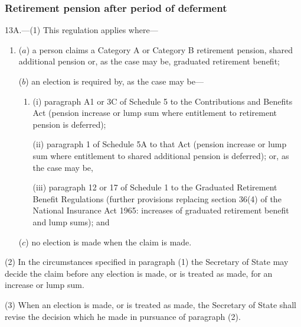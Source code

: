\documentclass[12pt,a4paper]{article}
\begin{document}

\subsubsection[13A. Retirement pension after period of deferment]{Retirement pension after period of deferment}

13A.---(1)  This regulation applies where—
\begin{enumerate}\item[]
($a$) a person claims a Category A or Category B retirement pension, shared additional pension or, as the case may be, graduated retirement benefit;

($b$) an election is required by, as the case may be—
\begin{enumerate}\item[]
(i) paragraph A1 or 3C of Schedule 5 to the Contributions and Benefits Act (pension increase or lump sum where entitlement to retirement pension is deferred);

(ii) paragraph 1 of Schedule 5A to that Act (pension increase or lump sum where entitlement to shared additional pension is deferred); or, as the case may be,

(iii) paragraph 12 or 17 of Schedule 1 to the Graduated Retirement Benefit Regulations (further provisions replacing section 36(4) of the National Insurance Act 1965: increases of graduated retirement benefit and lump sums); and 
\end{enumerate}

($c$) no election is made when the claim is made.
\end{enumerate}

(2) In the circumstances specified in paragraph (1) the Secretary of State may decide the claim before any election is made, or is treated as made, for an increase or lump sum.

(3) When an election is made, or is treated as made, the Secretary of State shall revise the decision which he made in pursuance of paragraph (2).
\end{document}
